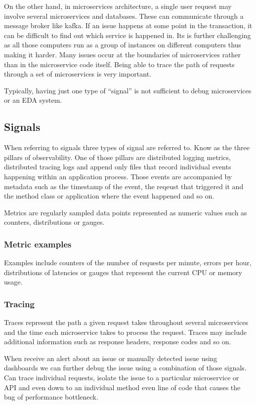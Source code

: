 On the other hand, in microservices architecture, a single user request may involve several microservices and databases.
These can communicate through a message broker like kafka.
If an issue happens at some point in the transaction, it can be difficult to find out which service is happened in.
Its is further challenging as all those computers run as a group of instances on different computers thus making it harder.
Many issues occur at the boundaries of microservices rather than in the microservice code itself.
Being able to trace the path of requests through a set of microservices is very important.

Typically, having just one type of ``signal'' is not sufficient to debug microservices or an EDA system.

\subsection{Signals}
When referring to signals three types of signal are referred to.
Know as the three pillars of observability.
One of those pillars are distributed logging metrics, distributed tracing logs and append only files that record individual events happening within an application process.
Those events are accompanied by metadata such as the timestamp of the event, the reqeust that triggered it and the method class or application where the event happened and so on.

Metrics are regularly sampled data points represented as numeric values such as counters, distributions or gauges.

\subsubsection{Metric examples}
Examples include counters of the number of requests per minute, errors per hour, distributions of latencies or gauges that represent the current CPU or memory usage.

\subsubsection{Tracing}
Traces represent the path a given request takes throughout several microservices and the time each microservice takes to process the request.
Traces may include additional information such as response headers, response codes and so on.

When receive an alert about an issue or manually detected issue using dashboards we can further debug the issue using a combination of those signals.
Can trace individual requests, isolate the issue to a particular microservice or API and even down to an individual method even line of code that causes the bug of performance bottleneck.

